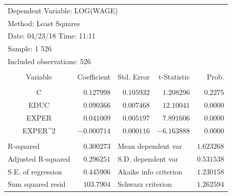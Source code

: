 \documentclass[12pt]{report}
\begin{document}
\begin{table}[H]
	\centering
	\begin{tabular}{lrrrr}
		\multicolumn{4}{l}{Dependent Variable: LOG(WAGE)}&\multicolumn{1}{c}{}\\
		\multicolumn{3}{l}{Method: Least Squares}&\multicolumn{1}{c}{}&\multicolumn{1}{c}{}\\
		\multicolumn{3}{l}{Date: 04/23/18   Time: 11:11}&\multicolumn{1}{c}{}&\multicolumn{1}{c}{}\\
		\multicolumn{2}{l}{Sample: 1 526}&\multicolumn{1}{c}{}&\multicolumn{1}{c}{}&\multicolumn{1}{c}{}\\
		\multicolumn{3}{l}{Included observations: 526}&\multicolumn{1}{c}{}&\multicolumn{1}{c}{}\\
		[4.5pt] \hline \\ [-4.5pt]
		\multicolumn{1}{c}{Variable}&\multicolumn{1}{r}{Coefficient}&\multicolumn{1}{r}{Std. Error}&\multicolumn{1}{r}{t-Statistic}&\multicolumn{1}{r}{Prob.}\\
		[4.5pt] \hline \\ [-4.5pt]
		\multicolumn{1}{c}{C}&\multicolumn{1}{r}{$0.127998$}&\multicolumn{1}{r}{$0.105932$}&\multicolumn{1}{r}{$1.208296$}&\multicolumn{1}{r}{$0.2275$}\\
		\multicolumn{1}{c}{EDUC}&\multicolumn{1}{r}{$0.090366$}&\multicolumn{1}{r}{$0.007468$}&\multicolumn{1}{r}{$12.10041$}&\multicolumn{1}{r}{$0.0000$}\\
		\multicolumn{1}{c}{EXPER}&\multicolumn{1}{r}{$0.041009$}&\multicolumn{1}{r}{$0.005197$}&\multicolumn{1}{r}{$7.891606$}&\multicolumn{1}{r}{$0.0000$}\\
		\multicolumn{1}{c}{EXPER\textasciicircum 2}&\multicolumn{1}{r}{$-0.000714$}&\multicolumn{1}{r}{$0.000116$}&\multicolumn{1}{r}{$-6.163888$}&\multicolumn{1}{r}{$0.0000$}\\
		[4.5pt] \hline \\ [-4.5pt]
		\multicolumn{1}{l}{R-squared}&\multicolumn{1}{r}{$0.300273$}&\multicolumn{2}{l}{Mean dependent var}&\multicolumn{1}{r}{$1.623268$}\\
		\multicolumn{1}{l}{Adjusted R-squared}&\multicolumn{1}{r}{$0.296251$}&\multicolumn{2}{l}{S.D. dependent var}&\multicolumn{1}{r}{$0.531538$}\\
		\multicolumn{1}{l}{S.E. of regression}&\multicolumn{1}{r}{$0.445906$}&\multicolumn{2}{l}{Akaike info criterion}&\multicolumn{1}{r}{$1.230158$}\\
		\multicolumn{1}{l}{Sum squared resid}&\multicolumn{1}{r}{$103.7904$}&\multicolumn{2}{l}{Schwarz criterion}&\multicolumn{1}{r}{$1.262594$}\\

\end{tabular}
\end{table}
\end{document}

